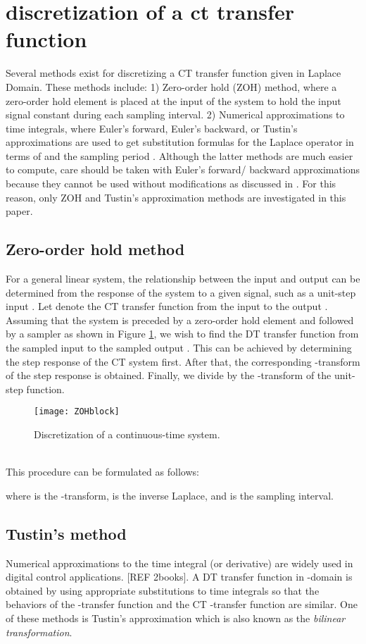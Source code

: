 \documentclass[10pt,journal,final]{IEEEtran}
\begin{document}
\section{discretization of a ct transfer function}\label{discretization}
Several methods exist for discretizing a CT transfer function given in Laplace Domain. These methods include: 1) Zero-order hold (ZOH) method, where a zero-order hold element is placed at the input of the system to hold the input signal constant during each sampling interval. 2) {Numerical} approximations to time integrals, where Euler's forward, Euler's backward, or Tustin's approximations are used to get substitution {formulas} for the Laplace operator  in terms of  and the sampling period . Although the latter methods are much easier to compute, care should be taken with Euler's forward/ backward approximations because they cannot be used without modifications as discussed in \cite{soderstrom1997least}. For this reason, only ZOH and Tustin's approximation methods are investigated in this paper.
\subsection{Zero-order hold method}
For a general linear system, the relationship between the input and output can be determined from the response of the system to a given signal, such as a unit-step input \cite{astrom2011computer}. Let  denote the CT transfer function from the input  to the output . Assuming that the system is preceded by a zero-order hold element and followed by a sampler as shown in Figure \ref{ZOHB}, we wish to find the DT {transfer} function from the sampled input  to the sampled output . This can be achieved by determining the step response of the CT system first. After that, the corresponding -transform of the step response is obtained. Finally, we divide by the -transform of the unit-step function.
\begin{figure}[h!]
\centering
\texttt{[image: ZOHblock]}
\caption{{Discretization of a continuous-time system.}} \label{ZOHB}
\end{figure}\\
This procedure can be formulated as follows:

where  is the -transform,  is the inverse Laplace, and  is the sampling interval.


\subsection{Tustin's method}
Numerical approximations to the time integral (or derivative) are widely used in digital control applications. [REF 2books]. A DT transfer function in -domain is obtained by using appropriate substitutions to time integrals so that the behaviors of the -transfer function and the CT -transfer function are similar. One of these methods is Tustin's approximation which is also known as the \textit{bilinear transformation}.
\end{document}
